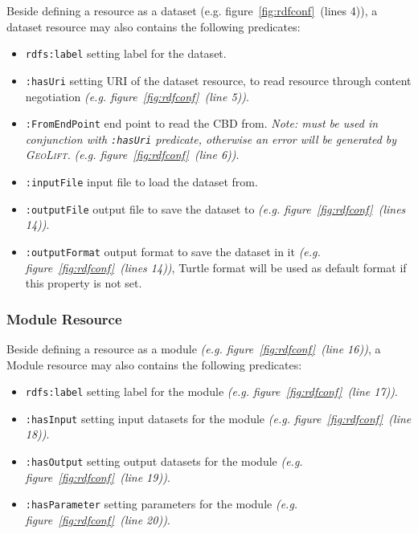 \documentclass[a4paper,twoside,bibtotoc,abstracton,12pt,BCOR=15mm]{article}
\newcommand{\geolift}{\textsc{GeoLift}\xspace}
\begin{document}
    Beside defining a resource as a dataset (e.g. figure~\ref{fig:rdfconf}~(lines 4)),
    a dataset resource may also contains the following predicates:
    \begin{itemize}
	\item \texttt{rdfs:label} setting label for the dataset.
	\item \texttt{:hasUri} setting URI of the dataset resource, to read resource through content negotiation \emph{(e.g. figure~\ref{fig:rdfconf}~(line 5))}.
	\item \texttt{:FromEndPoint} end point to read the CBD from. 
	\emph{Note: must be used in conjunction with \texttt{:hasUri} predicate, otherwise an error will be generated by \geolift.} \emph{(e.g. figure~\ref{fig:rdfconf}~(line 6))}.
	\item \texttt{:inputFile} input file to load the dataset from.
	\item \texttt{:outputFile} output file to save the dataset to \emph{(e.g. figure~\ref{fig:rdfconf}~(lines 14))}.
	\item \texttt{:outputFormat} output format to save the dataset in it \emph{(e.g. figure~\ref{fig:rdfconf}~(lines 14))}, Turtle format will be used as default format if this property is not set.
    \end{itemize}

\subsubsection{Module Resource}
    Beside defining a resource as a module \emph{(e.g. figure~\ref{fig:rdfconf}~(line 16))},
    a Module resource may also contains the following predicates:
    \begin{itemize}
	\item \texttt{rdfs:label} setting label for the module \emph{(e.g. figure~\ref{fig:rdfconf}~(line 17))}.
	\item \texttt{:hasInput} setting input datasets for the module \emph{(e.g. figure~\ref{fig:rdfconf}~(line 18))}.
	\item \texttt{:hasOutput} setting output datasets for the module \emph{(e.g. figure~\ref{fig:rdfconf}~(line 19))}.
	\item \texttt{:hasParameter} setting parameters for the module \emph{(e.g. figure~\ref{fig:rdfconf}~(line 20))}.
    \end{itemize}
\end{document}
